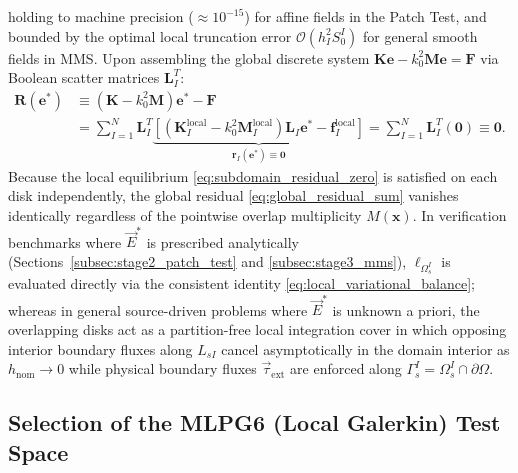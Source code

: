 \documentclass[VANCOUVER,Times1COL]{WileyNJD-v5}
\begin{document}
holding to machine precision ($\approx 10^{-15}$) for affine fields in the Patch Test, and bounded by the optimal local truncation error $\mathcal{O}(h_I^2 S_0^I)$ for general smooth fields in MMS. Upon assembling the global discrete system $\mathbf{K}\mathbf{e} - k_0^2 \mathbf{M}\mathbf{e} = \mathbf{F}$ via Boolean scatter matrices $\mathbf{L}_I^T$:
\begin{equation}
    \begin{aligned}
        \mathbf{R}(\mathbf{e}^*) & \equiv (\mathbf{K} - k_0^2 \mathbf{M})\mathbf{e}^* - \mathbf{F} \\
                                 & = \sum_{I=1}^N \mathbf{L}_I^T \underbrace{\left[ (\mathbf{K}_I^{\mathrm{local}} - k_0^2 \mathbf{M}_I^{\mathrm{local}}) \mathbf{L}_I \mathbf{e}^* - \mathbf{f}_I^{\mathrm{local}} \right]}_{\mathbf{r}_I(\mathbf{e}^*) \equiv \mathbf{0}} = \sum_{I=1}^N \mathbf{L}_I^T (\mathbf{0}) \equiv \mathbf{0}.
    \end{aligned}
    \label{eq:global_residual_sum}
\end{equation}
Because the local equilibrium \eqref{eq:subdomain_residual_zero} is satisfied on each disk independently, the global residual \eqref{eq:global_residual_sum} vanishes identically regardless of the pointwise overlap multiplicity $M(\mathbf{x})$. In verification benchmarks where $\vec{E}^*$ is prescribed analytically (Sections~\ref{subsec:stage2_patch_test} and \ref{subsec:stage3_mms}), $\ell_{\Omega_s^I}$ is evaluated directly via the consistent identity \eqref{eq:local_variational_balance}; whereas in general source-driven problems where $\vec{E}^*$ is unknown a priori, the overlapping disks act as a partition-free local integration cover in which opposing interior boundary fluxes along $L_{sI}$ cancel asymptotically in the domain interior as $h_{\mathrm{nom}} \to 0$ while physical boundary fluxes $\vec{\tau}_{\mathrm{ext}}$ are enforced along $\Gamma_s^I = \Omega_s^I \cap \partial\Omega$.

\subsection{Selection of the MLPG6 (Local Galerkin) Test Space}
\label{subsec:mlpg6_selection}
\end{document}
